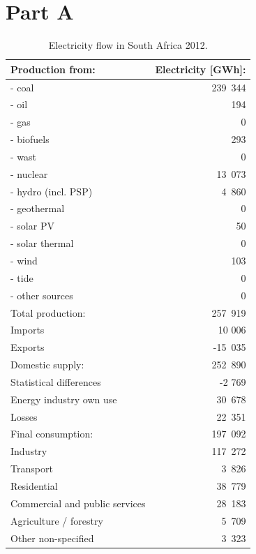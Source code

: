 \documentclass[Master,MEE,english]{twbook}%
\begin{document}
\section{Part A}
\begin{table}[h] %
\centering
\begin{tabular}{| l | r |}\hline
Production from: & Electricity [GWh]:\\\hline
- coal & 239~344 \\
- oil & 194 \\
- gas & 0 \\
- biofuels & 293 \\
- wast & 0 \\
- nuclear & 13~073 \\
- hydro (incl. PSP) & 4~860 \\
- geothermal & 0 \\
- solar PV & 50 \\
- solar thermal & 0 \\
- wind & 103 \\
- tide & 0 \\
- other sources & 0 \\\hline
Total production: & 257~919 \\\hline
Imports & 10 006 \\
Exports & -15~035 \\\hline
Domestic supply: & 252~890 \\\hline
Statistical differences & -2 769 \\
Energy industry own use & 30~678 \\
Losses & 22~351 \\\hline
Final consumption: & 197~092\\\hline
Industry & 117~272 \\
Transport & 3~826 \\
Residential & 38~779 \\
Commercial and public services & 28~183 \\
Agriculture / forestry  & 5~709 \\
Other non-specified & 3~323 \\\hline
\end{tabular}
\caption[Electricity flow in South Africa 2012.]{Electricity flow in South Africa 2012\cite{Agency2015}.}\label{tab1}
\end{table}
\pagebreak
\end{document}
